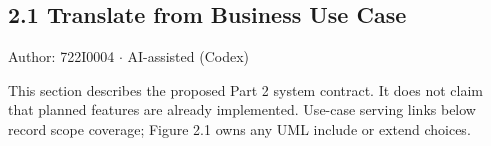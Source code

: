 \subsection*{2.1 Translate from Business Use Case}
Author: 722I0004 \ensuremath{\cdot} AI-assisted (Codex)

This section describes the proposed Part 2 system contract. It does not claim that planned features are already implemented. Use-case serving links below record scope coverage; Figure 2.1 owns any UML \guillemotleft{}include\guillemotright{} or \guillemotleft{}extend\guillemotright{} choices.
